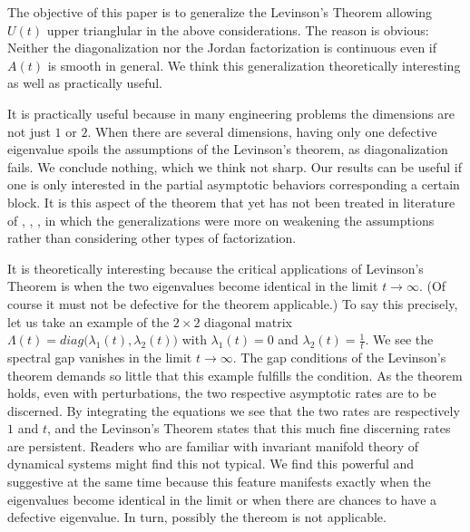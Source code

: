 \documentclass[a4paper,11pt]{article}
\newcounter{Theorem}
\theoremstyle{remark}
\begin{document}
The objective of this paper is to generalize the Levinson's Theorem allowing $U(t)$ upper trianglular in the above considerations. The reason is obvious: Neither the diagonalization nor the Jordan factorization is continuous even if $A(t)$ is smooth in general. We think this generalization theoretically interesting as well as practically useful. 

It is practically useful because in many engineering problems the dimensions are not just $1$ or $2$. When there are several dimensions, having only one defective eigenvalue spoils the assumptions of the Levinson's theorem, as diagonalization fails. We conclude nothing, which we think not sharp. Our results can be useful if one is only interested in the partial asymptotic behaviors corresponding a certain block. It is this aspect of the theorem that yet has not been treated in literature of \cite{HL77}, \cite{HX94}, \cite{DE99}, \cite{BL07} in which the generalizations were more on weakening the assumptions rather than considering other types of factorization.

It is theoretically interesting because the critical applications of Levinson's Theorem is when the two eigenvalues become identical in the limit $t \rightarrow \infty$. (Of course it must not be defective for the theorem applicable.) To say this precisely, let us take an example of the $2\times 2$ diagonal matrix $\Lambda(t) = diag\big(\lambda_1(t),\lambda_2(t)\big)$ with $\lambda_1(t) = 0$ and $\lambda_2(t) = \frac{1}{t}$. We see the spectral gap vanishes in the limit $t \rightarrow \infty$. The gap conditions of the Levinson's theorem demands so little that this example fulfills the condition. As the theorem holds, even with perturbations, the two respective asymptotic rates are to be discerned. By integrating the equations we see that the two rates are respectively $1$ and $t$, and the Levinson's Theorem states that this much fine discerning rates are persistent. Readers who are familiar with invariant manifold theory of dynamical systems might find this not typical. %
We find this powerful and suggestive at the same time because this feature manifests exactly when the eigenvalues become identical in the limit or when there are chances to have a defective eigenvalue. In turn, possibly the thereom is not applicable.
\end{document}
